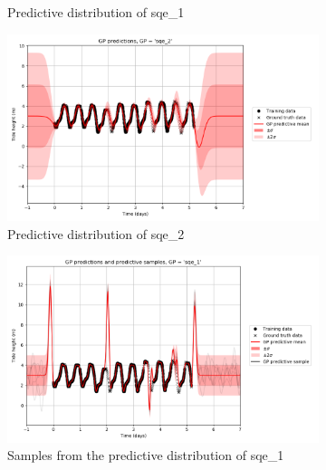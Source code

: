 \documentclass{article}
\begin{document}
\begin{figure}[pht]
\begin{subfigure}{0.45\textwidth}
        \caption{Predictive distribution of sqe\_1}
        \label{fig:pred_dist_sqe_1}
    \end{subfigure}
    \begin{subfigure}{0.45\textwidth}
        \centering
        \includegraphics[width=\textwidth]{GP_predictions,_GP____sqe_2_.png}
        \caption{Predictive distribution of sqe\_2}
        \label{fig:pred_dist_sqe_2}
    \end{subfigure}
    \newline
    \begin{subfigure}{0.45\textwidth}
        \centering
        \includegraphics[width=\textwidth]{GP_predictions_and_predictive_samples,_GP____sqe_1_.png}
        \caption{Samples from the predictive distribution of sqe\_1}
        \label{fig:pred_samples_sqe_1}
    \end{subfigure}
    \begin{subfigure}{0.45\textwidth}
        \centering

\end{subfigure}
\end{figure}
\end{document}

